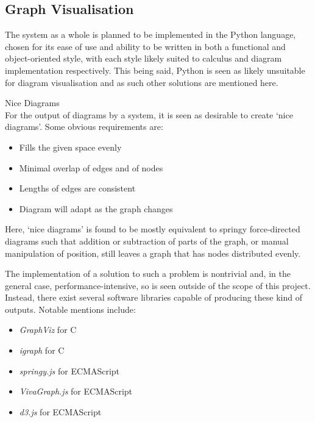 \subsection{Graph Visualisation}

    The system as a whole is planned to be implemented in the Python language, chosen for its ease of use and ability to be written in both a functional and object-oriented style, with each style likely suited to calculus and diagram implementation respectively.
    This being said, Python is seen as likely unsuitable for diagram visualisation and as such other solutions are mentioned here.\\
    
    \begin{definition*}{Nice Diagrams\\}
        For the output of diagrams by a system, it is seen as desirable to create `nice diagrams'.
        Some obvious requirements are:
        \begin{itemize}
            \item Fills the given space evenly
            \item Minimal overlap of edges and of nodes
            \item Lengths of edges are consistent
            \item Diagram will adapt as the graph changes
        \end{itemize}
        Here, `nice diagrams' is found to be mostly equivalent to springy force-directed diagrams such that addition or subtraction of parts of the graph, or manual manipulation of position, still leaves a graph that has nodes distributed evenly.
    \end{definition*}


    \begin{examples}
        The implementation of a solution to such a problem is nontrivial and, in the general case, performance-intensive, so is seen outside of the scope of this project.
        Instead, there exist several software libraries capable of producing these kind of outputs.
        Notable mentions include:
        \begin{itemize}
            \item \textit{GraphViz} for C~\footnotemark
            \item \textit{igraph} for C~\addtocounter{footnote}{-1}\footnotemark
            \item \textit{springy.js} for ECMAScript
            \item \textit{VivaGraph.js} for ECMAScript
            \item \textit{d3.js} for ECMAScript
        \end{itemize}
    \end{examples}

